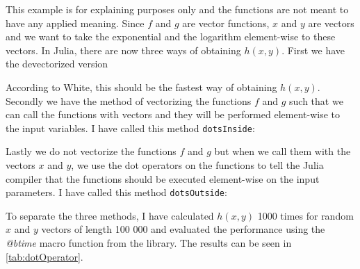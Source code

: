 This example is for explaining purposes only and the functions are not meant to have any applied meaning. Since $f$ and $g$ are vector functions, $x$ and $y$ are vectors and we want to take the exponential and the logarithm element-wise to these vectors. In Julia, there are now three ways of obtaining $h(x,y)$. First we have the devectorized version 

According to White, this should be the fastest way of obtaining $h(x,y)$. Secondly we have the method of vectorizing the functions $f$ and $g$ such that we can call the functions with vectors and they will be performed element-wise to the input variables. I have called this method \texttt{dotsInside}:

Lastly we do not vectorize the functions $f$ and $g$ but when we call them with the vectors $x$ and $y$, we use the dot operators on the functions to tell the Julia compiler that the functions should be executed element-wise on the input parameters. I have called this method \texttt{dotsOutside}:

To separate the three methods, I have calculated $h(x,y)$ 1000 times for random $x$ and $y$ vectors of length 100 000 and evaluated the performance using the \textit{@btime} macro function from the \emph{\cite{BenchmarkTools}} library. The results can be seen in \autoref{tab:dotOperator}.

